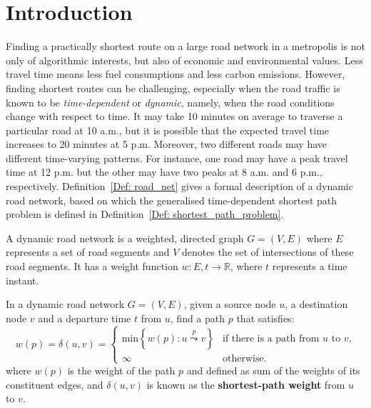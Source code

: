 \chapter{Introduction}

Finding a practically shortest route on a large road network in a metropolis is not only of algorithmic interests, but also of economic and environmental values. Less travel time means less fuel consumptions and less carbon emissions. However, finding shortest routes can be challenging, especially when the road traffic is known to be \emph{time-dependent} or \emph{dynamic}, namely, when the road conditions change with respect to time. It may take 10 minutes on average to traverse a particular road at 10 a.m., but it is possible that the expected travel time increases to 20 minutes at 5 p.m. Moreover, two different roads may have different time-varying patterns. For instance, one road may have a peak travel time at 12 p.m. but the other may have two peaks at 8 a.m. and 6 p.m., respectively. Definition~\ref{Def: road_net} gives a formal description of a dynamic road network, based on which the generalised time-dependent shortest path problem is defined in Definition~\ref{Def: shortest_path_problem}.

\begin{defn}\label{Def: road_net}
A dynamic road network is a weighted, directed graph $G=(V,E)$ where $E$ represents a set of road segments and $V$ denotes the set of intersections of these road segments. It has a weight function $w : E,t \rightarrow \mathbb{R}$, where $t$ represents a time instant. 
\end{defn}

\begin{defn}\label{Def: shortest_path_problem}
In a dynamic road network $G=(V,E)$, given a source node $u$, a destination node $v$ and a departure time $t$ from $u$, find a path $p$ that satisfies:
\begin{equation}
w(p)=\delta(u,v)=
\begin{cases}
\text{min}\left\{w(p): u\overset{p}{\leadsto}v \right\} &\text{if there is a path from $u$ to $v$,}\\
\infty &\text{otherwise.}
\end{cases}
\end{equation}
where $w(p)$ is the weight of the path $p$ and defined as sum of the weights of its constituent edges, and $\delta(u,v)$ is known as the \textbf{shortest-path weight} from $u$ to $v$.
\end{defn}

